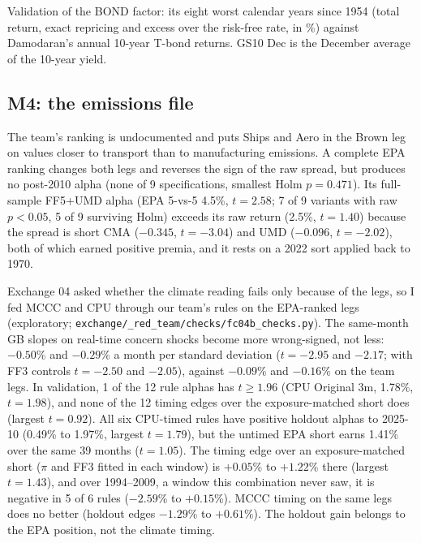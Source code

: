\begin{table}[H]
\caption{Validation of the BOND factor: its eight worst calendar years since 1954 (total return, exact repricing and excess over the risk-free rate, in \%) against Damodaran's annual 10-year T-bond returns. GS10 Dec is the December average of the 10-year yield.}
\centering\footnotesize
\begin{adjustbox}{max width=\linewidth}\end{adjustbox}
\end{table}

\subsection{M4: the emissions file}
\label{app:m4}
The team's ranking is undocumented and puts Ships and Aero in the Brown leg on values closer to transport than to manufacturing emissions. A complete EPA ranking changes both legs and reverses the sign of the raw spread, but produces no post-2010 alpha (none of 9 specifications, smallest Holm $p=0.471$). Its full-sample FF5+UMD alpha (EPA 5-vs-5 4.5\%, $t=2.58$; 7 of 9 variants with raw $p<0.05$, 5 of 9 surviving Holm) exceeds its raw return (2.5\%, $t=1.40$) because the spread is short CMA ($-0.345$, $t=-3.04$) and UMD ($-0.096$, $t=-2.02$), both of which earned positive premia, and it rests on a 2022 sort applied back to 1970.

Exchange 04 asked whether the climate reading fails only because of the legs, so I fed MCCC and CPU through our team's rules on the EPA-ranked legs (exploratory; \texttt{exchange/\_red\_team/\allowbreak checks/\allowbreak fc04b\_checks.py}). The same-month GB slopes on real-time concern shocks become more wrong-signed, not less: $-0.50$\% and $-0.29$\% a month per standard deviation ($t=-2.95$ and $-2.17$; with FF3 controls $t=-2.50$ and $-2.05$), against $-0.09$\% and $-0.16$\% on the team legs. In validation, 1 of the 12 rule alphas has $t\ge1.96$ (CPU Original 3m, 1.78\%, $t=1.98$), and none of the 12 timing edges over the exposure-matched short does (largest $t=0.92$). All six CPU-timed rules have positive holdout alphas to 2025-10 (0.49\% to 1.97\%, largest $t=1.79$), but the untimed EPA short earns 1.41\% over the same 39 months ($t=1.05$). The timing edge over an exposure-matched short ($\pi$ and FF3 fitted in each window) is $+0.05$\% to $+1.22$\% there (largest $t=1.43$), and over 1994--2009, a window this combination never saw, it is negative in 5 of 6 rules ($-2.59$\% to $+0.15$\%). MCCC timing on the same legs does no better (holdout edges $-1.29$\% to $+0.61$\%). The holdout gain belongs to the EPA position, not the climate timing.

